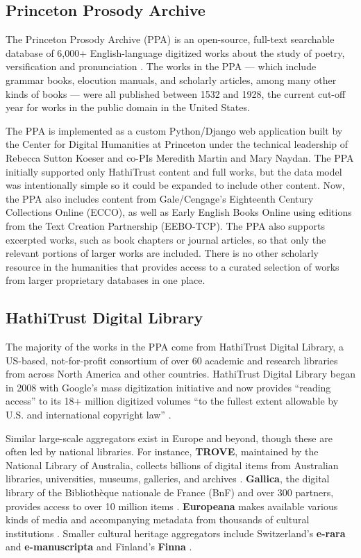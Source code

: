 \documentclass{anthology-ch}         %
\begin{document}
\subsection{Princeton Prosody Archive }

The Princeton Prosody Archive (PPA) is an open-source, full-text searchable database of 6,000+ English-language digitized works about the study of poetry, versification and pronunciation \cite{noauthor_princeton_nodate}. The works in the PPA — which include grammar books, elocution manuals, and scholarly articles, among many other kinds of books — were all published between 1532 and 1928, the current cut-off year for works in the public domain in the United States.

The PPA is implemented as a custom Python/Django web application built by the Center for Digital Humanities at Princeton under the technical leadership of Rebecca Sutton Koeser and co-PIs Meredith Martin and Mary Naydan. The PPA initially supported only HathiTrust content and full works, but the data model was intentionally simple so it could be expanded to include other content. Now, the PPA also includes content from Gale/Cengage’s Eighteenth Century Collections Online (ECCO), as well as Early English Books Online using editions from the Text Creation Partnership (EEBO-TCP). The PPA also supports excerpted works, such as book chapters or journal articles, so that only the relevant portions of larger works are included. There is no other scholarly resource in the humanities that provides access to a curated selection of works from larger proprietary databases in one place. 

\subsection{HathiTrust Digital Library}

The majority of the works in the PPA come from HathiTrust Digital Library, a US-based, not-for-profit consortium of over 60 academic and research libraries from across North America and other countries. HathiTrust Digital Library began in 2008 with Google’s mass digitization initiative and now provides “reading access” to its 18+ million digitized volumes “to the fullest extent allowable by U.S. and international copyright law” \cite{noauthor_welcome_nodate}.

Similar large-scale aggregators exist in Europe and beyond, though these are often led by national libraries. For instance, \textbf{TROVE}, maintained by the National Library of Australia, collects billions of digital items from Australian libraries, universities, museums, galleries, and archives \cite{noauthor_home_nodate}. \textbf{Gallica}, the digital library of the Bibliothèque nationale de France (BnF) and over 300 partners, provides access to over 10 million items \cite{noauthor_page_nodate}. \textbf{Europeana} makes available various kinds of media and accompanying metadata from thousands of cultural institutions \cite{noauthor_discover_nodate}. Smaller cultural heritage aggregators include Switzerland’s \textbf{e-rara} \cite{noauthor_e-rara_nodate} and \textbf{e-manuscripta} \cite{noauthor_e-manuscripta_nodate} and Finland’s \textbf{Finna} \cite{noauthor_search_nodate}.
 
\end{document}
